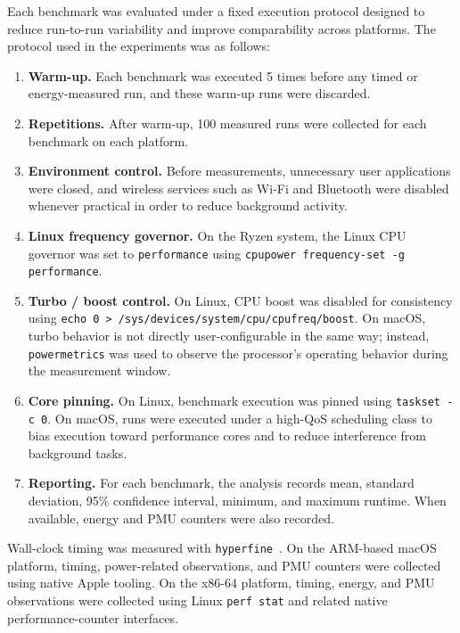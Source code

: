 \documentclass{tcsa}
\begin{document}
Each benchmark was evaluated under a fixed execution protocol designed to reduce
run-to-run variability and improve comparability across platforms. The protocol
used in the experiments was as follows:

\begin{enumerate}
    \item \textbf{Warm-up.} Each benchmark was executed 5 times before any timed
    or energy-measured run, and these warm-up runs were discarded.
    \item \textbf{Repetitions.} After warm-up, 100 measured runs were collected
    for each benchmark on each platform.
    \item \textbf{Environment control.} Before measurements, unnecessary user
    applications were closed, and wireless services such as Wi-Fi and Bluetooth
    were disabled whenever practical in order to reduce background activity.
    \item \textbf{Linux frequency governor.} On the Ryzen system, the Linux CPU
    governor was set to \texttt{performance} using
    \texttt{cpupower frequency-set -g performance}.
    \item \textbf{Turbo / boost control.} On Linux, CPU boost was disabled for
    consistency using \texttt{echo 0 > /sys/devices/system/cpu/cpufreq/boost}.
    On macOS, turbo behavior is not directly user-configurable in the same way;
    instead, \texttt{powermetrics} was used to observe the processor's operating
    behavior during the measurement window.
    \item \textbf{Core pinning.} On Linux, benchmark execution was pinned using
    \texttt{taskset -c 0}. On macOS, runs were executed under a high-QoS
    scheduling class to bias execution toward performance cores and to reduce
    interference from background tasks.
    \item \textbf{Reporting.} For each benchmark, the analysis records mean,
    standard deviation, 95\% confidence interval, minimum, and maximum runtime.
    When available, energy and PMU counters were also recorded.
\end{enumerate}

Wall-clock timing was measured with \texttt{hyperfine}~\cite{hyperfine}. On the
ARM-based macOS platform, timing, power-related observations, and PMU counters
were collected using native Apple tooling. On the x86-64 platform, timing,
energy, and PMU observations were collected using Linux \texttt{perf stat} and
related native performance-counter interfaces.
\end{document}

